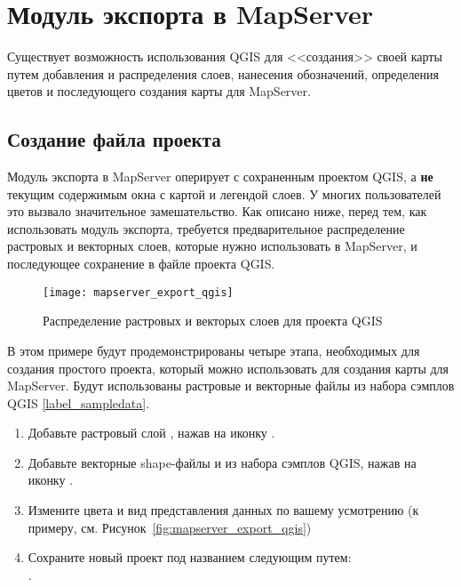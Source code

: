 
\section{Модуль экспорта в MapServer}\label{sec:mapserver_export}


Существует возможность использования QGIS для <<создания>> своей карты
путем добавления и распределения слоев, нанесения обозначений,
определения цветов и последующего создания карты для MapServer.

\subsection{Создание файла проекта}

Модуль экспорта в MapServer оперирует с сохраненным проектом QGIS, а
\textbf{не} текущим содержимым окна с картой и легендой слоев. У
многих пользователей это вызвало значительное замешательство. Как
описано ниже, перед тем, как использовать модуль экспорта, требуется
предварительное распределение растровых и векторных слоев, которые нужно
использовать в MapServer, и последующее сохранение в файле проекта QGIS.

\begin{figure}[ht]
\centering
  \texttt{[image: mapserver\_export\_qgis]}
   \caption{Распределение растровых и векторых слоев для проекта QGIS \nixcaption}
  \label{fig:mapserver_export_qgs}
\end{figure}

В этом примере будут продемонстрированы четыре этапа, необходимых для
создания простого проекта, который можно использовать для создания карты
для MapServer. Будут использованы растровые и векторные файлы из набора
сэмплов QGIS \ref{label_sampledata}.

\begin{enumerate}
\item Добавьте растровый слой , нажав на иконку
.
\item Добавьте векторные shape-файлы 
и  из набора сэмплов QGIS, нажав на иконку
.
\item Измените цвета и вид представления данных по вашему усмотрению
(к примеру, см. Рисунок~\ref{fig:mapserver_export_qgis})
\item Сохраните новый проект под названием 
следующим путем: \\
 \arrow {}.
\end{enumerate}

